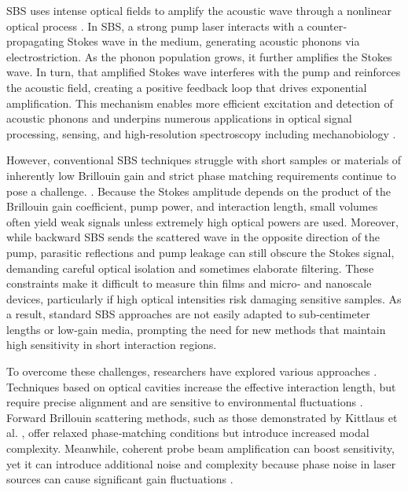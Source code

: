 \ac{SBS} uses intense optical fields to amplify the acoustic wave through a nonlinear optical process \cite{chiao1964stimulated}. In \ac{SBS}, a strong pump laser interacts with a counter‐propagating Stokes wave in the medium, generating acoustic phonons via electrostriction. As the phonon population grows, it further amplifies the Stokes wave. In turn, that amplified Stokes wave interferes with the pump and reinforces the acoustic field, creating a positive feedback loop that drives exponential amplification. This mechanism enables more efficient excitation and detection of acoustic phonons and underpins numerous applications in optical signal processing, sensing, and high‐resolution spectroscopy including mechanobiology \cite{eggleton2013inducing, fotiadi2023brillouin, kobyakov2009stimulated, ippen1972stimulated, speziale2014brillouin, palombo2019brillouin, dil1982brillouin, eggleton2019brillouin, prevedel2019brillouin, conrad2019mechanical}.

However, conventional \ac{SBS} techniques struggle with short samples or materials of inherently low Brillouin gain and strict phase matching requirements continue to pose a challenge. \cite{rakich2012giant, gyger2020observation, yu2024chip}. Because the Stokes amplitude depends on the product of the Brillouin gain coefficient, pump power, and interaction length, small volumes often yield weak signals unless extremely high optical powers are used. Moreover, while backward \ac{SBS} sends the scattered wave in the opposite direction of the pump, parasitic reflections and pump leakage can still obscure the Stokes signal, demanding careful optical isolation and sometimes elaborate filtering. These constraints make it difficult to measure thin films and micro‐ and nanoscale devices, particularly if high optical intensities risk damaging sensitive samples. As a result, standard \ac{SBS} approaches are not easily adapted to sub‐centimeter lengths or low‐gain media, prompting the need for new methods that maintain high sensitivity in short interaction regions.

To overcome these challenges, researchers have explored various approaches \cite{shin2013tailorable, van2015interaction, kittlaus2016large, djadaojee2020stimulated, gusev2018advances, gerakis2011coherent}. Techniques based on optical cavities increase the effective interaction length, but require precise alignment and are sensitive to environmental fluctuations \cite{pant2011cavity}. Forward Brillouin scattering methods, such as those demonstrated by Kittlaus et al. \cite{kittlaus2017chip}, offer relaxed phase‐matching conditions but introduce increased modal complexity. Meanwhile, coherent probe beam amplification can boost sensitivity, yet it can introduce additional noise and complexity because phase noise in laser sources can cause significant gain fluctuations \cite{shlomovits2015effect}.

